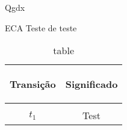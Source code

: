  
\glsaddall
\newpage
\printglossary[type=\acronymtype,title=Acronyms]
\newpage 
\printglossary[title=Glossary]
\newpage
\mainmatter

\gls{Qgdx}










\gls{ECA}
Teste de teste
\begin{table}[H]
  \centering
  \begin{tabular}{cc}
    \label{tab:tab1}
    \hypertarget{tab:1}{}
    Transição&Significado\\
    \hline \\
    \hyperlink{net:1}{$t_{1}$}&Test

  \end{tabular}
  \caption{table}
\end{table}








\backmatter

\nocite{*}



\appendix


